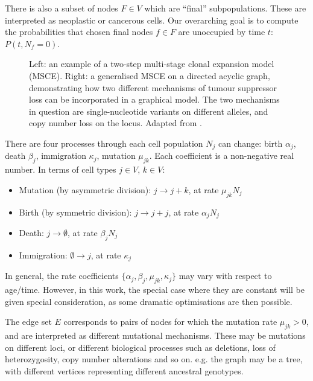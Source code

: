 \documentclass{article}
\begin{document}
There is also a subset of nodes $F \in V$ which are ``final'' subpopulations. These
are interpreted as neoplastic or cancerous cells. Our overarching goal is to
compute the probabilities that chosen final nodes $f \in F$ are
unoccupied by time $t$: $P(t, N_f = 0)$.

\begin{figure}
    \caption{Left: an example of a two-step multi-stage clonal expansion
    model (MSCE). Right: a generalised MSCE on a directed acyclic graph,
    demonstrating how two different mechanisms of tumour suppressor loss can be
    incorporated in a graphical model. The two mechanisms in question are
    single-nucleotide variants on different alleles, and copy number loss on the
    locus. Adapted from \cite{Paterson2021vs}.}
\end{figure}

There are four processes through each cell population $N_j$ can change: birth
$\alpha_j$, death $\beta_j$, immigration $\kappa_j$, mutation $\mu_{jk}$. Each
coefficient is a non-negative real number. In terms of cell types $j \in V$, $k \in V$:

\begin{itemize}
    \item Mutation (by asymmetric division): $j \rightarrow j + k$, at rate
    $\mu_{jk} N_j$
    \item Birth (by symmetric division): $j \rightarrow j + j$, at rate
    $\alpha_j N_j$
    \item Death: $j \rightarrow \emptyset$, at rate $\beta_j N_j$
    \item Immigration: $\emptyset \rightarrow j$, at rate $\kappa_j$
\end{itemize}

In general, the rate coefficients $\{\alpha_j, \beta_j, \mu_{jk},
\kappa_j\}$ may vary with respect to age/time. However, in this work, the
special case where they are constant will be given special consideration, as
some dramatic optimisations are then possible.

The edge set $E$ corresponds to pairs of nodes for which the mutation rate
$\mu_{jk} > 0$, and are interpreted as different mutational mechanisms. These may be
mutations on different loci, or different biological processes such as
deletions, loss of heterozygosity, copy number alterations and so on. 
e.g. the graph may be a tree, with different vertices representing different
ancestral genotypes.
\end{document}
